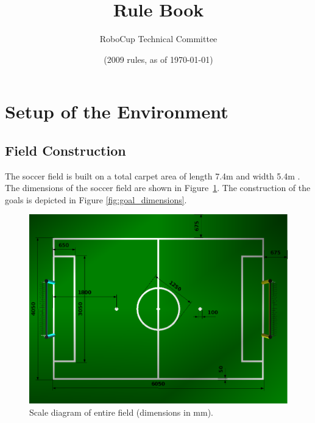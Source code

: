 \documentclass[12pt]{article}
\title{\leaguename Rule Book}
\author{RoboCup Technical Committee}
\date{(2009 rules, as of \today)}
\newcommand{\TotalWidth}{{5.4m }}
\newcommand{\TotalLength}{{7.4m }}
\begin{document}
\maketitle

\vfill

\tableofcontents
\setcounter{tocdepth}{3}

\thispagestyle{fancy}

\clearpage

\cfoot{\thepage}
\setcounter{page}{1}

\section{Setup of the Environment}

\subsection{Field Construction}

The soccer field is built on a total carpet area of length \TotalLength  and width \TotalWidth. The dimensions of the soccer field are shown in Figure~\ref{fig:field_dim}. The construction of the goals is depicted in Figure \ref{fig:goal_dimensions}.

\begin{figure}[b!]
\centerline{\includegraphics[width=\columnwidth]{figs/fieldDimensions2009.png}}
\caption{Scale diagram of entire field (dimensions in mm).} \label{fig:field_dim}
\end{figure}


\end{document}
